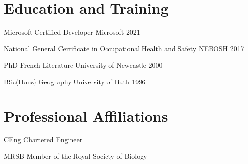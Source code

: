 \documentclass[a4paper]{CV_responsibilities_achievements}
\begin{document}
\section{Education and Training}

\EducationTraining
    {Microsoft Certified Developer} %
    {Microsoft} %
    {2021} %

\EducationTraining
    {National General Certificate in Occupational Health and Safety} %
    {NEBOSH} %
    {2017} %

\EducationTraining
    {PhD French Literature} %
    {University of Newcastle} %
    {2000} %

\EducationTraining
    {BSc(Hons) Geography} %
    {University of Bath} %
    {1996} %

%
%
%

\section{Professional Affiliations}

\Affiliation
    {CEng}
    {Chartered Engineer}

\Affiliation
    {MRSB}
    {Member of the Royal Society of Biology}
\end{document}
